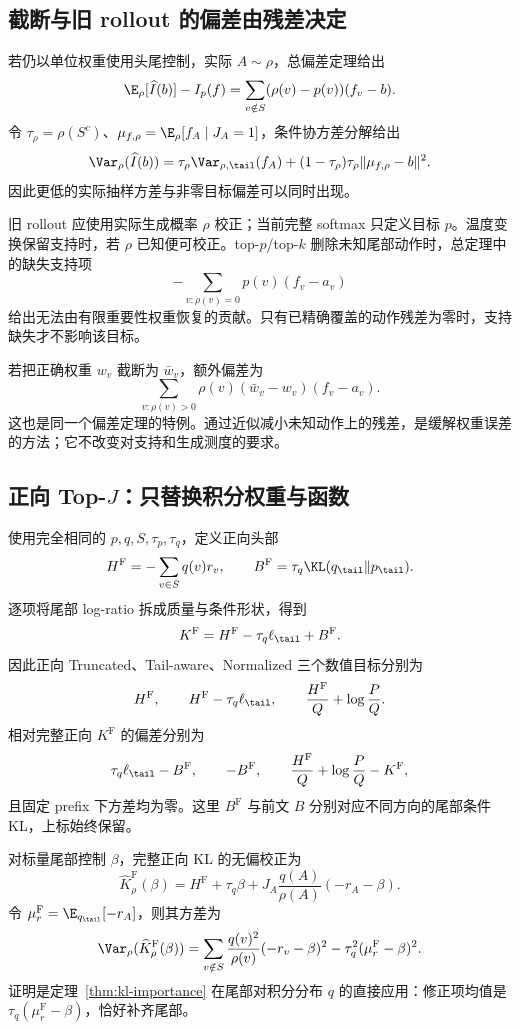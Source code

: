 \subsection{截断与旧 rollout 的偏差由残差决定}
若仍以单位权重使用头尾控制，实际 $A\sim\rho$，总偏差定理给出
\begin{equation}\label{eq:kl-wrong-measure-bias}
 \E_\rho[\widehat I(b)]-I_p(f)
 =\sum_{v\notin S}(\rho(v)-p(v))(f_v-b).
\end{equation}
令 $\tau_\rho=\rho(S^c)$、$\mu_{f,\rho}=\E_\rho[f_A\mid J_A=1]$，条件协方差分解给出
\begin{equation}\label{eq:kl-wrong-measure-var}
 \Var_\rho(\widehat I(b))
 =\tau_\rho\Var_{\rho,\tail}(f_A)
 +(1-\tau_\rho)\tau_\rho\|\mu_{f,\rho}-b\|^2.
\end{equation}
因此更低的实际抽样方差与非零目标偏差可以同时出现。

旧 rollout 应使用实际生成概率 $\rho$ 校正；当前完整 softmax 只定义目标 $p$。温度变换保留支持时，若 $\rho$ 已知便可校正。top-$p$/top-$k$ 删除未知尾部动作时，总定理中的缺失支持项
\[
 -\sum_{v:\rho(v)=0}p(v)(f_v-a_v)
\]
给出无法由有限重要性权重恢复的贡献。只有已精确覆盖的动作残差为零时，支持缺失才不影响该目标。

若把正确权重 $w_v$ 截断为 $\bar w_v$，额外偏差为
\[
 \sum_{v:\rho(v)>0}\rho(v)(\bar w_v-w_v)(f_v-a_v).
\]
这也是同一个偏差定理的特例。通过近似减小未知动作上的残差，是缓解权重误差的方法；它不改变对支持和生成测度的要求。

\subsection{正向 Top-$J$：只替换积分权重与函数}

使用完全相同的 $p,q,S,\tau_p,\tau_q$，定义正向头部
\[
 H^{\mathrm F}=-\sum_{v\in S}q(v)r_v,\qquad
 B^{\mathrm F}=\tau_q\KL(q_{\tail}\Vert p_{\tail}).
\]
逐项将尾部 log-ratio 拆成质量与条件形状，得到
\[
 K^{\mathrm F}=H^{\mathrm F}-\tau_q\ell_{\tail}+B^{\mathrm F}.
\]
因此正向 Truncated、Tail-aware、Normalized 三个数值目标分别为
\[
 H^{\mathrm F},\qquad
 H^{\mathrm F}-\tau_q\ell_{\tail},\qquad
 \frac{H^{\mathrm F}}{Q}+\log\frac{P}{Q}.
\]
相对完整正向 $K^{\mathrm F}$ 的偏差分别为
\[
 \tau_q\ell_{\tail}-B^{\mathrm F},\qquad
 -B^{\mathrm F},\qquad
 \frac{H^{\mathrm F}}{Q}+\log\frac{P}{Q}-K^{\mathrm F},
\]
且固定 prefix 下方差均为零。这里 $B^{\mathrm F}$ 与前文 $B$ 分别对应不同方向的尾部条件 KL，上标始终保留。

对标量尾部控制 $\beta$，完整正向 KL 的无偏校正为
\[
 \widehat K^{\mathrm F}_\rho(\beta)
 =H^{\mathrm F}+\tau_q\beta
   +J_A\frac{q(A)}{\rho(A)}(-r_A-\beta).
\]
令 $\mu_r^{\mathrm F}=\E_{q_{\tail}}[-r_A]$，则其方差为
\[
 \Var_\rho(\widehat K^{\mathrm F}_\rho(\beta))
 =\sum_{v\notin S}\frac{q(v)^2}{\rho(v)}(-r_v-\beta)^2
   -\tau_q^2(\mu_r^{\mathrm F}-\beta)^2.
\]
证明是定理~\ref{thm:kl-importance} 在尾部对积分分布 $q$ 的直接应用：修正项均值是 $\tau_q(\mu_r^{\mathrm F}-\beta)$，恰好补齐尾部。

